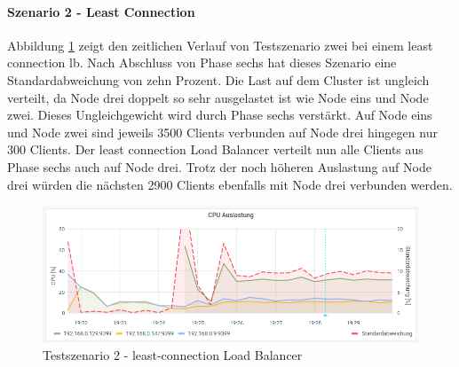 \paragraph{Szenario 2 - Least Connection}
Abbildung \ref{fig:s2-lc} zeigt den zeitlichen Verlauf von Testszenario zwei bei einem least connection \ac{lb}.
Nach Abschluss von Phase sechs hat dieses Szenario eine Standardabweichung von zehn Prozent.
Die Last auf dem Cluster ist ungleich verteilt, da Node drei doppelt so sehr ausgelastet ist wie Node eins und Node zwei.
Dieses Ungleichgewicht wird durch Phase sechs verstärkt. Auf Node eins und Node zwei sind jeweils 3500 Clients verbunden auf Node drei hingegen nur 300 Clients. Der least connection Load Balancer verteilt nun alle Clients aus Phase sechs auch auf Node drei. Trotz der noch höheren Auslastung auf Node drei würden die nächsten 2900 Clients ebenfalls mit Node drei verbunden werden.
\begin{figure}
    \centering
    \includegraphics[scale=0.8]{images/s2_lc.png}
    \caption{Testszenario 2 - least-connection Load Balancer}
    \label{fig:s2-lc}
\end{figure}

